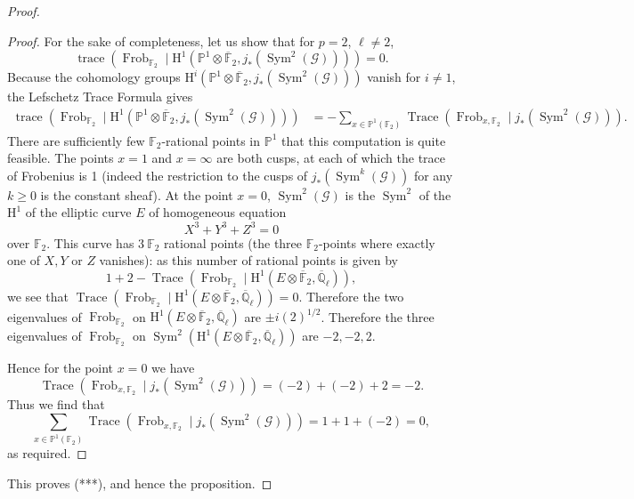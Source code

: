 \begin{proof}
\begin{proof}
For the sake of completeness, let us show that for \(p=2\), \(\ell\ne2\),
\[
\operatorname{trace}(\operatorname{Frob}_{\mathbb{F}_2}\mid\mathrm{H}^1(\mathbb{P}^1\otimes\overline{\mathbb{F}}_2,j_*(\operatorname{Sym}^2(\mathcal{G}))))=0.
\]
Because the cohomology groups \(\mathrm{H}^i(\mathbb{P}^1\otimes\overline{\mathbb{F}}_2,j_*(\operatorname{Sym}^2(\mathcal{G})))\) vanish for \(i\ne1\), the Lefschetz Trace Formula gives
\[
\begin{aligned}
\operatorname{trace}(\operatorname{Frob}_{\mathbb{F}_2}\mid\mathrm{H}^1(\mathbb{P}^1\otimes\overline{\mathbb{F}}_2,j_*(\operatorname{Sym}^2(\mathcal{G}))))
&=-\sum_{x\in\mathbb{P}^1(\mathbb{F}_2)}\operatorname{Trace}(\operatorname{Frob}_{x,\mathbb{F}_2}\mid j_*(\operatorname{Sym}^2(\mathcal{G}))).
\end{aligned}
\]
There are sufficiently few \(\mathbb{F}_2\)-rational points in \(\mathbb{P}^1\) that this computation is quite feasible. The points \(x=1\) and \(x=\infty\) are both cusps, at each of which the trace of Frobenius is 1 (indeed the restriction to the cusps of \(j_*(\operatorname{Sym}^k(\mathcal{G}))\) for any \(k\geq0\) is the constant sheaf). At the point \(x=0\), \(\operatorname{Sym}^2(\mathcal{G})\) is the \(\operatorname{Sym}^2\) of the \(\mathrm{H}^1\) of the elliptic curve \(E\) of homogeneous equation
\[
X^3+Y^3+Z^3=0
\]
over \(\mathbb{F}_2\). This curve has \(3\ \mathbb{F}_2\) rational points (the three \(\mathbb{F}_2\)-points where exactly one of \(X,Y\) or \(Z\) vanishes): as this number of rational points is given by
\[
1+2-\operatorname{Trace}(\operatorname{Frob}_{\mathbb{F}_2}\mid\mathrm{H}^1(E\otimes\overline{\mathbb{F}}_2,\overline{\mathbb{Q}}_\ell)),
\]
we see that \(\operatorname{Trace}(\operatorname{Frob}_{\mathbb{F}_2}\mid\mathrm{H}^1(E\otimes\overline{\mathbb{F}}_2,\overline{\mathbb{Q}}_\ell))=0\). Therefore the two eigenvalues of \(\operatorname{Frob}_{\mathbb{F}_2}\) on \(\mathrm{H}^1(E\otimes\overline{\mathbb{F}}_2,\overline{\mathbb{Q}}_\ell)\) are \(\pm i(2)^{1/2}\). Therefore the three eigenvalues of \(\operatorname{Frob}_{\mathbb{F}_2}\) on \(\operatorname{Sym}^2(\mathrm{H}^1(E\otimes\overline{\mathbb{F}}_2,\overline{\mathbb{Q}}_\ell))\) are \(-2,-2,2\).

Hence for the point \(x=0\) we have
\[
\operatorname{Trace}(\operatorname{Frob}_{x,\mathbb{F}_2}\mid j_*(\operatorname{Sym}^2(\mathcal{G})))=(-2)+(-2)+2=-2.
\]
Thus we find that
\[
\sum_{x\in\mathbb{P}^1(\mathbb{F}_2)}\operatorname{Trace}(\operatorname{Frob}_{x,\mathbb{F}_2}\mid j_*(\operatorname{Sym}^2(\mathcal{G})))=1+1+(-2)=0,
\]
as required.
\end{proof}
This proves (***), and hence the proposition.
\end{proof}
